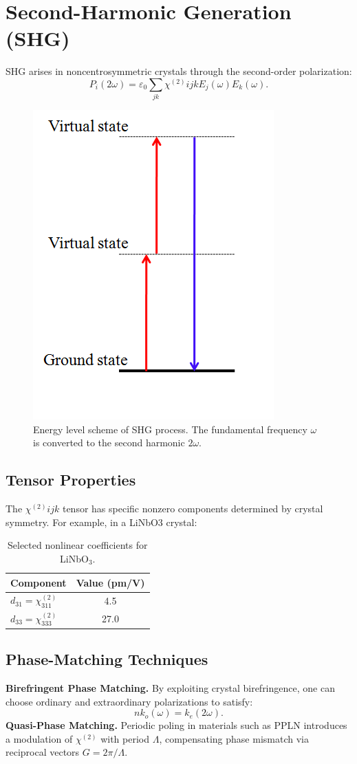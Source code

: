 \documentclass[9pt,a4paper,twocolumn,twoside]{tau-class/tau}
\begin{document}
\section{Second-Harmonic Generation (SHG)}
SHG arises in noncentrosymmetric crystals through the second-order polarization:
\begin{equation}
P_i(2\omega) = \varepsilon_0 \sum_{jk} \chi^{(2)}{ijk} E_j(\omega)E_k(\omega).
\end{equation}

\begin{figure}[h!]
\centering
\includegraphics[width=0.35\columnwidth]{figures/Energy_level_scheme_of_SHG.png}
\caption{Energy level scheme of SHG process. \cite{SobarwikiImage} The fundamental frequency $\omega$ is converted to the second harmonic $2\omega$.}
\end{figure}

\subsection{Tensor Properties}
The $\chi^{(2)}{ijk}$ tensor has specific nonzero components determined by crystal symmetry. For example, in a LiNbO$3$ crystal:
\begin{table}[h!]
\centering
\begin{tabular}{l c}
\toprule
Component & Value (pm/V) \\
\midrule
$d_{31} = \chi^{(2)}_{311}$ & 4.5 \\
$d_{33} = \chi^{(2)}_{333}$ & 27.0 \\
\bottomrule
\end{tabular}
\caption{Selected nonlinear coefficients for LiNbO$_3$.}
\end{table}

\subsection{Phase-Matching Techniques}
\textbf{Birefringent Phase Matching.} By exploiting crystal birefringence, one can choose ordinary and extraordinary polarizations to satisfy:
\begin{equation}
n k_o(\omega) = k_e(2\omega).
\end{equation}
\textbf{Quasi-Phase Matching.} Periodic poling in materials such as PPLN introduces a modulation of $\chi^{(2)}$ with period $\Lambda$, compensating phase mismatch via reciprocal vectors $G = 2\pi/\Lambda$.
\end{document}
